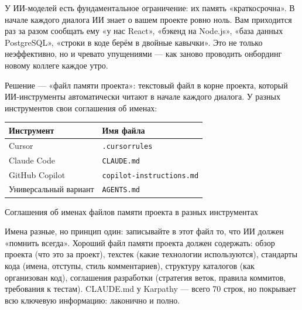 


У ИИ-моделей есть фундаментальное ограничение: их память «краткосрочна». В начале каждого диалога ИИ знает о вашем проекте ровно ноль. Вам приходится раз за разом сообщать ему «у нас React», «бэкенд на Node.js», «база данных PostgreSQL», «строки в коде берём в двойные кавычки». Это не только неэффективно, но и чревато упущениями — как заново проводить онбординг новому коллеге каждое утро.

Решение — «файл памяти проекта»: текстовый файл в корне проекта, который ИИ-инструменты автоматически читают в начале каждого диалога. У разных инструментов свои соглашения об именах:

\begin{center}
\begin{tabularx}{\linewidth}{|X|X|}
\hline
\textbf{Инструмент} & \textbf{Имя файла} \tabularnewline
\hline
Cursor & \texttt{.\allowbreak cursorrules} \tabularnewline
Claude Code & \texttt{CLAUDE.\allowbreak md} \tabularnewline
GitHub Copilot & \texttt{copilot-\allowbreak instructions.\allowbreak md} \tabularnewline
Универсальный вариант & \texttt{AGENTS.\allowbreak md} \tabularnewline
\hline
\end{tabularx}
\end{center}

\begin{center}\small\color{gray}Соглашения об именах файлов памяти проекта в разных инструментах\end{center}

Имена разные, но принцип один: записывайте в этот файл то, что ИИ должен «помнить всегда». Хороший файл памяти проекта должен содержать: обзор проекта (что это за проект), техстек (какие технологии используются), стандарты кода (имена, отступы, стиль комментариев), структуру каталогов (как организован код), соглашения разработки (стратегия веток, правила коммитов, требования к тестам). CLAUDE.md у Karpathy — всего 70 строк, но покрывает всю ключевую информацию: лаконично и полно.

